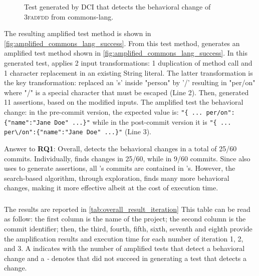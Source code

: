 \begin{figure}[h]
\caption{Test generated by DCI that detects the behavioral change of \textsc{3fadfdd} from commons-lang.}
\label{fig:amplified_commons_lang_success}
\end{figure}

The resulting amplified test method is shown in \autoref{fig:amplified_commons_lang_success}.
From this test method, \DCI generates an amplified test method shown in \autoref{fig:amplified_commons_lang_success}. 
In this generated test, \sbampl applies 2 input transformations: 1 duplication of method call and 1 character replacement in an existing String literal.
The latter transformation is the key transformation: \DCI replaced an 's' inside "person" by '/' resulting in "per/on" where "/" is a special character that must be escaped (Line 2). 
Then, \DCI generated 11 assertions, based on the modified inputs. 
The amplified test the behavioral change:
in the pre-commit version, the expected value is: \texttt{"\{ ... per/on":\{"name":"Jane Doe" ...\}"} while in the post-commit version it is \texttt{"\{ ... per\textbackslash/on":\{"name":"Jane Doe" ...\}"} (Line 3).
 
\begin{mdframed}
Answer to \textbf{RQ1}: Overall, \DCI detects the behavioral changes in a total of 25/60 commits. 
Individually, \DCII finds changes in 25/60, while \DCIA in 9/60 commits.
Since \DCII also uses \aampl to generate assertions, all \DCIA's commits are contained in \DCII's. 
However, the search-based algorithm, through exploration, finds many more behavioral changes, making it more effective albeit at the cost of execution time.
\end{mdframed}


\subsubsection{\rqiteration}
\label{subsubsec:dci:evaluation:rq2}

The results are reported in \autoref{tab:overall_result_iteration}
This table can be read as follow:
the first column is the name of the project;
the second column is the commit identifier;
then, the third, fourth, fifth, sixth, seventh and eighth provide the amplification results and execution time for each number of iteration 1, 2, and 3.
A \cmark indicates with the number of amplified tests that detect a behavioral change and a \textit{-} denotes that \DCI did not succeed in generating a test that detects a change.

